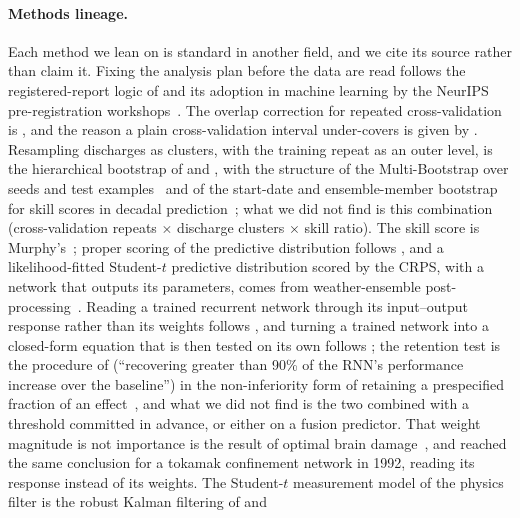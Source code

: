 \documentclass[10pt]{article}
\begin{document}
\paragraph{Methods lineage.}
Each method we lean on is standard in another field, and we cite its source rather
than claim it. Fixing the analysis plan before the data are read follows the
registered-report logic of \citet{Nosek2014RegisteredReports} and its adoption in
machine learning by the NeurIPS pre-registration
workshops~\citep{Bertinetto2021Preregistration}. The overlap correction for repeated
cross-validation is \citet{Nadeau2003Inference}, and the reason a plain
cross-validation interval under-covers is given by \citet{Bates2024CrossValidation}.
Resampling discharges as clusters, with the training repeat as an outer level, is
the hierarchical bootstrap of \citet{Saravanan2020Hierarchical} and
\citet{Ren2010Nonparametric}, with the structure of the Multi-Bootstrap over seeds
and test examples~\citep{Sellam2022MultiBERTs} and of the start-date and
ensemble-member bootstrap for skill scores in decadal
prediction~\citep{Goddard2013Verification}; what we did not find is this combination
(cross-validation repeats $\times$ discharge clusters $\times$ skill ratio). The
skill score is Murphy's~\citep{murphy1988}; proper scoring of the predictive
distribution follows \citet{Gneiting2007StrictlyProper}, and a likelihood-fitted
Student-$t$ predictive distribution scored by the CRPS, with a network that outputs
its parameters, comes from weather-ensemble
post-processing~\citep{Gebetsberger2018Estimation,Rasp2018NeuralNetworks}. Reading a
trained recurrent network through its input--output response rather than its weights
follows \citet{Sussillo2013OpeningBlackBox}, and turning a trained network into a
closed-form equation that is then tested on its own follows
\citet{Cranmer2020DiscoveringSymbolic}; the retention test is the procedure of
\citet{Maheswaranathan2020HowRecurrent} (``recovering greater than 90\% of the RNN's
performance increase over the baseline'') in the non-inferiority form of retaining a
prespecified fraction of an effect~\citep{Rothmann2003Design}, and what we did not
find is the two combined with a threshold committed in advance, or either on a fusion
predictor. That weight magnitude is not importance is the result of optimal brain
damage~\citep{LeCun1990OptimalBrainDamage}, and \citet{Allen1992NeuralNetwork}
reached the same conclusion for a tokamak confinement network in 1992, reading its
response instead of its weights. The Student-$t$ measurement model of the physics
filter is the robust Kalman filtering of \citet{Roth2013StudentT} and
\end{document}
